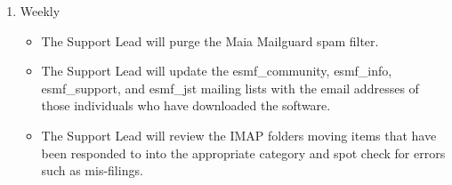 \begin{enumerate}
\item Weekly
  \begin{itemize}
  \item The Support Lead will purge the Maia Mailguard spam filter.
  \item The Support Lead will update the esmf\_community, esmf\_info, esmf\_support, and esmf\_jst mailing lists with the email addresses of those individuals who have downloaded the software.
  \item The Support Lead will review the IMAP folders moving items that have been responded to into the appropriate category and spot check for errors such as mis-filings.
  \end{itemize}

\end{enumerate}  
 
